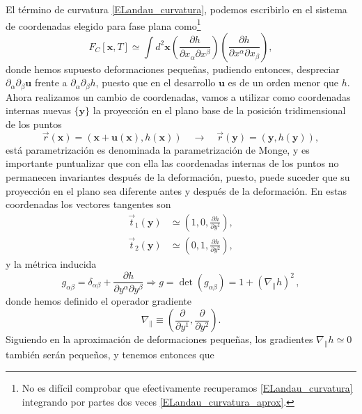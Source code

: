 El término de curvatura \eqref{ELandau_curvatura}, podemos escribirlo en el sistema de coordenadas
elegido para fase plana como\footnote{No es difícil comprobar que
  efectivamente recuperamos \eqref{ELandau_curvatura} integrando por partes
  dos veces \eqref{ELandau_curvatura_aprox}.}
\begin{equation}\label{ELandau_curvatura_aprox}
F_C[\mathbf{x},T]\simeq\int d^2\mathbf{x} 
\left(\frac{\partial h}{\partial x_{\alpha} \partial x^{\beta}}\right)
\left(\frac{\partial h}{\partial x^{\alpha} \partial x_{\beta}}\right),
\end{equation}
donde hemos supuesto deformaciones pequeñas, pudiendo entonces, despreciar
$\partial_{\alpha}\partial_{\beta} \mathbf{u}$ frente a
$\partial_{\alpha}\partial_{\beta} h$, puesto que en el desarrollo
$\mathbf{u}$ es de un orden menor que $h$. Ahora realizamos un cambio de
coordenadas, vamos a utilizar como coordenadas internas nuevas $\{\mathbf{y}\}$ la proyección
en el plano base de la posición tridimensional de los puntos
\begin{equation*}
\vec{r}(\mathbf{x})=(\mathbf{x}+\mathbf{u(\mathbf{x})},h(\mathbf{x}))\quad
\rightarrow \quad \vec{r}(\mathbf{y})=(\mathbf{y},h(\mathbf{y})),
\end{equation*}
está parametrización es denominada la parametrización de Monge, y es
importante puntualizar que con ella las coordenadas internas de los puntos no
permanecen invariantes después de la deformación, puesto, puede suceder que su
proyección en el plano sea diferente antes y después de la deformación. En
estas coordenadas los vectores tangentes son
\begin{align*}
 \vec{t}_1(\mathbf{y})&\simeq\left(1,0,\frac{\partial h}{\partial y^1}\right),\\
 \vec{t}_2(\mathbf{y})&\simeq\left(0,1,\frac{\partial h}{\partial y^2}\right),
\end{align*}
y la métrica inducida
\begin{equation*}
g_{\alpha\beta}=\delta_{\alpha\beta}+\frac{\partial h}{\partial
  y^{\alpha} \partial y^{\beta}}\Rightarrow g=\det
(g_{\alpha\beta})=1+\left(\nabla_{\|} h\right)^2\, ,
\end{equation*}
donde hemos definido el operador gradiente 
\begin{equation*}
\nabla_{\|}\equiv \left(\frac{\partial }{\partial y^1},\frac{\partial }{\partial y^2}\right).
\end{equation*}
Siguiendo en la aproximación de deformaciones pequeñas, los gradientes
$\nabla_{\|} h\simeq 0$ también serán pequeños, y tenemos entonces que
